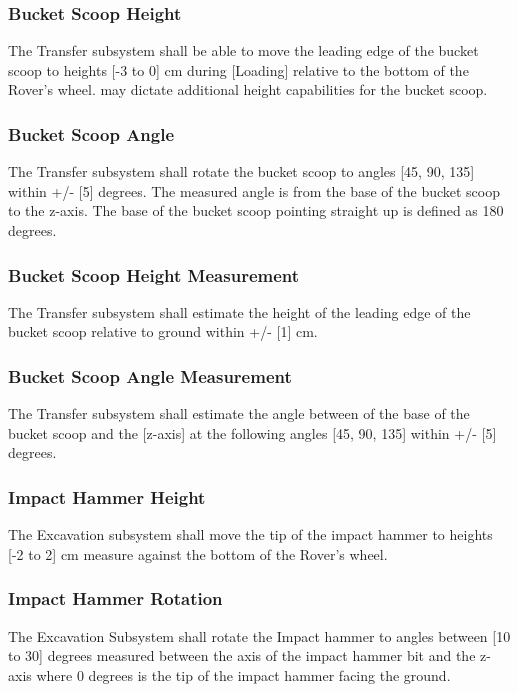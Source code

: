 \subsubsection{Bucket Scoop Height}
\label{ref:Bucket Scoop Height}
The Transfer subsystem shall be able to move the leading edge of the bucket scoop to heights [-3 to 0] cm during [Loading] relative to the bottom of the Rover's wheel.  may dictate additional height capabilities for the bucket scoop. 
\subsubsection{Bucket Scoop Angle}
\label{ref:Bucket Scoop Angle}
The Transfer subsystem shall rotate the bucket scoop to angles [45, 90, 135] within +/- [5] degrees. The measured angle is from the base of the bucket scoop to the z-axis. The base of the bucket scoop pointing straight up is defined as 180 degrees.
\subsubsection{Bucket Scoop Height Measurement}
\label{ref:Bucket Scoop Height Measurement}
The Transfer subsystem shall estimate the height of the leading edge of the bucket scoop relative to ground within +/- [1] cm. 
\subsubsection{Bucket Scoop Angle Measurement}
\label{ref:Bucket Scoop Angle Measurement}
The Transfer subsystem shall estimate the angle between of the base of the bucket scoop and the [z-axis] at the following angles [45, 90, 135] within +/- [5] degrees.
\subsubsection{Impact Hammer Height}
\label{ref:Impact Hammer Height}
The Excavation subsystem shall move the tip of the impact hammer to heights [-2 to 2] cm measure against the bottom of the Rover's wheel.
\subsubsection{Impact Hammer Rotation}
\label{ref:Impact Hammer Rotation}
The Excavation Subsystem shall rotate the Impact hammer to angles between [10 to 30] degrees measured between the axis of the impact hammer bit and the z-axis where 0 degrees is the tip of the impact hammer facing the ground. 
